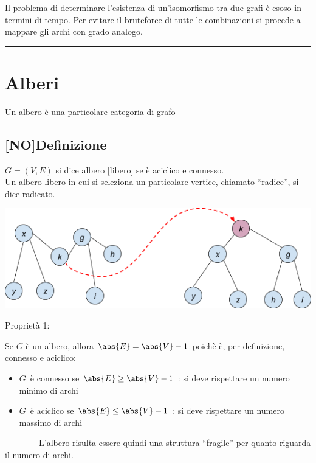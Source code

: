 \documentclass{article}
\providecommand{\tightlist}{%
  \setlength{\itemsep}{0pt}\setlength{\parskip}{0pt}}
\begin{document}
{{{{}

{Il problema di determinare l'esistenza di un'isomorfismo tra due grafi è esoso in termini di tempo. Per evitare il bruteforce di tutte le combinazioni si procede a mappare gli archi con grado analogo.}

\begin{center}\rule{0.5\linewidth}{\linethickness}\end{center}

\hypertarget{h.jnoiha3cadu8}{\section{\texorpdfstring{{Alberi}}{Alberi}}\label{h.jnoiha3cadu8}}

{Un albero è una particolare categoria di grafo}

\subsection{{[}NO{]}Definizione}

$G=(V,E)$ si dice albero {[}libero{]} se è aciclico e connesso.\\
Un albero libero in cui si seleziona un particolare vertice, chiamato ``radice'', si dice radicato.

{\includegraphics{images/image533.png}}

{Proprietà 1:}

Se $G$ è un albero, allora $\abs{E} = \abs{V} - 1$ poichè è, per definizione, connesso e aciclico:

\begin{itemize}
\tightlist
\item
  $G${~è connesso se $\abs{E} \geq \abs{V} - 1$ : si deve rispettare un numero minimo di archi}
\item
  $G${~è aciclico se $\abs{E} \leq \abs{V} - 1$ : si deve rispettare un numero massimo di archi}
\end{itemize}

{~~~~~~~~L'albero risulta essere quindi una struttura ``fragile'' per
quanto riguarda il numero di archi.}

}}}
\end{document}

